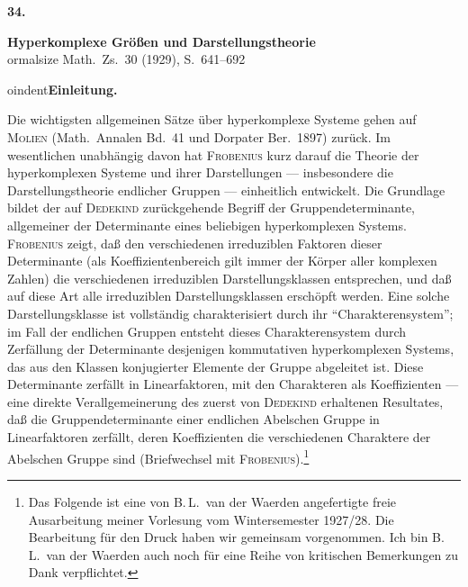 \documentclass[12pt,a4paper]{article}
\theoremstyle{definition}
\begin{document}
\begin{center}
{\Large\bfseries 34.}
\medskip

{\Large\bfseries Hyperkomplexe Gr\"o\ss en und Darstellungstheorie}\\[0.5em]
{ ormalsize Math.\ Zs.\ 30 (1929), S.\ 641--692}
\end{center}

\vspace{0.5em}



oindent\textbf{Einleitung.}

Die wichtigsten allgemeinen S\"atze \"uber hyperkomplexe Systeme gehen
auf \textsc{Molien} (Math.\ Annalen Bd.\ 41 und Dorpater Ber.\ 1897)
zur\"uck. Im wesentlichen unabh\"angig davon hat \textsc{Frobenius} kurz
darauf die Theorie der hyperkomplexen Systeme und ihrer Darstellungen
--- insbesondere die Darstellungstheorie endlicher Gruppen --- einheitlich
entwickelt. Die Grundlage bildet der auf \textsc{Dedekind} zur\"uckgehende
Begriff der Gruppendeterminante, allgemeiner der Determinante eines
beliebigen hyperkomplexen Systems. \textsc{Frobenius} zeigt, da\ss{} den
verschiedenen irreduziblen Faktoren dieser Determinante (als
Koeffizientenbereich gilt immer der K\"orper aller komplexen Zahlen) die
verschiedenen irreduziblen Darstellungsklassen entsprechen, und da\ss{}
auf diese Art alle irreduziblen Darstellungsklassen ersch\"opft werden.
Eine solche Darstellungsklasse ist vollst\"andig charakterisiert durch ihr
``Charakterensystem''; im Fall der endlichen Gruppen entsteht dieses
Charakterensystem durch Zerf\"allung der Determinante desjenigen
kommutativen hyperkomplexen Systems, das aus den Klassen konjugierter
Elemente der Gruppe abgeleitet ist. Diese Determinante zerf\"allt in
Linearfaktoren, mit den Charakteren als Koeffizienten --- eine direkte
Verallgemeinerung des zuerst von \textsc{Dedekind} erhaltenen Resultates,
da\ss{} die Gruppendeterminante einer endlichen Abelschen Gruppe in
Linearfaktoren zerf\"allt, deren Koeffizienten die verschiedenen
Charaktere der Abelschen Gruppe sind (Briefwechsel mit
\textsc{Frobenius}).\footnote{Das Folgende ist eine von B.\,L.\ van der
Waerden angefertigte freie Ausarbeitung meiner Vorlesung vom
Wintersemester 1927/28. Die Bearbeitung f\"ur den Druck haben wir
gemeinsam vorgenommen. Ich bin B.\,L.\ van der Waerden auch noch f\"ur
eine Reihe von kritischen Bemerkungen zu Dank verpflichtet.}

\medskip
\end{document}
